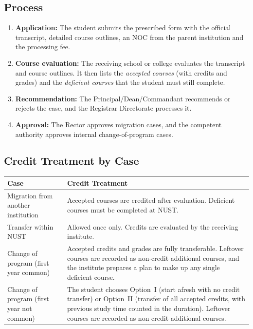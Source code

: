 \subsection{Process}
\begin{enumerate}
    \item \textbf{Application:} The student submits the prescribed form with the official transcript, detailed course outlines, an NOC from the parent institution and the processing fee.
    \item \textbf{Course evaluation:} The receiving school or college evaluates the transcript and course outlines. It then lists the \textit{accepted courses} (with credits and grades) and the \textit{deficient courses} that the student must still complete.
    \item \textbf{Recommendation:} The Principal/Dean/Commandant recommends or rejects the case, and the Registrar Directorate processes it.
    \item \textbf{Approval:} The Rector approves migration cases, and the competent authority approves internal change-of-program cases.
\end{enumerate}

\subsection{Credit Treatment by Case}
\begin{table}[htbp]
\centering
\small
\begin{tabular}{p{3.6cm} p{9cm}}
\toprule
\textbf{Case} & \textbf{Credit Treatment} \\
\midrule
Migration from another institution & Accepted courses are credited after evaluation. Deficient courses must be completed at NUST. \\
Transfer within NUST & Allowed once only. Credits are evaluated by the receiving institute. \\
Change of program (first year common) & Accepted credits and grades are fully transferable. Leftover courses are recorded as non-credit additional courses, and the institute prepares a plan to make up any single deficient course. \\
Change of program (first year not common) & The student chooses Option~I (start afresh with no credit transfer) or Option~II (transfer of all accepted credits, with previous study time counted in the duration). Leftover courses are recorded as non-credit additional courses. \\
\bottomrule
\end{tabular}
\end{table}


